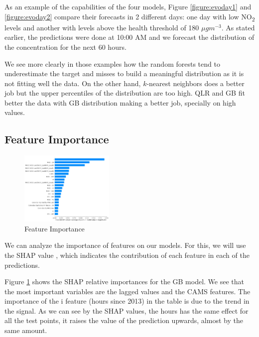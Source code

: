 \documentclass[a4paper,twocolumn,5p]{elsarticle}
\begin{document}
As an example of the capabilities of the four models, Figure
\ref{figure:evoday1} and \ref{figure:evoday2} compare their forecasts
in 2 different days: one day with low NO\textsubscript{2} levels and
another with levels above the health threshold of 180 $\mu gm^{-3}$.
As stated earlier, the predictions were done at 10:00 AM and we
forecast the distribution of the concentration for the next 60 hours.

We see more clearly in those examples how the random forests tend to
underestimate the target and misses to build a meaningful distribution
as it is not fitting well the data. On the other hand, $k$-nearest
neighbors does a better job but the upper percentiles of the
distribution are too high.  QLR and GB fit better the data with GB
distribution making a better job, specially on high values.

\subsection{Feature Importance}

\begin{figure}[tbp]
  \centering
  \includegraphics[width=0.4\textwidth]{imp_feat}
  \caption{Feature Importance}
  \label{figure:imp_feat}
\end{figure}

We can analyze the importance of features on our models. For this, we
will use the SHAP value \cite{lundberg_unified_2017}, which indicates
the contribution of each feature in each of the predictions.

Figure \ref{figure:imp_feat} shows the SHAP relative importances for
the GB model.  We see that the most important
variables are the lagged values and the CAMS features. The importance
of the i feature (hours since 2013) in the table is due to the trend
in the signal. As we can see by the SHAP values, the hours has the
same effect for all the test points, it raises the value of the
prediction upwards, almost by the same amount. 
\end{document}
